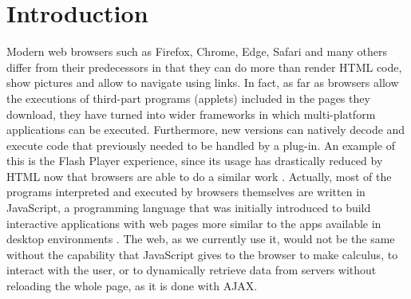 \documentclass{article}
\begin{document}
\section{Introduction}
Modern web browsers such as Firefox, Chrome, Edge, Safari and many
others differ from their predecessors in that they can do more than
render HTML code, show pictures and allow to navigate using links. In
fact, as far as browsers allow the executions of third-part programs
(applets) included in the
pages they download, they have turned into wider
frameworks in which multi-platform applications can be executed.
Furthermore, new versions can natively decode and execute code that previously needed to be handled by a plug-in. An example of this is the Flash Player experience, since its usage has drastically reduced by HTML now that browsers are able to do a similar work \cite{Winokur11}.
Actually, most of the programs interpreted and executed by browsers themselves are written in JavaScript, a programming language that was initially introduced  to build interactive applications
with web pages more similar to the apps available in desktop
environments \cite{Rauschmayer04}. %
The web, as we currently use it, would not be the same without the
capability that JavaScript gives to the browser to make calculus,
to interact with the user, or to dynamically retrieve data from servers
without reloading the whole page, as it is done with AJAX\cite{powell2008ajax}. %
\end{document}
